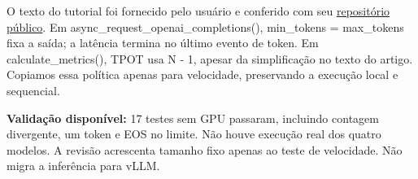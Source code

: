 \documentclass[10pt,a4paper]{article}
\begin{document}
O texto do tutorial foi fornecido pelo usuário e conferido com seu \href{https://github.com/gjgjos/vllm_benchmark_serving}{repositório público}. Em async\_request\_openai\_completions(), min\_tokens = max\_tokens fixa a saída; a latência termina no último evento de token. Em calculate\_metrics(), TPOT usa N - 1, apesar da simplificação no texto do artigo. Copiamos essa política apenas para velocidade, preservando a execução local e sequencial.

\textbf{Validação disponível:} 17 testes sem GPU passaram, incluindo contagem divergente, um token e EOS no limite. Não houve execução real dos quatro modelos. A revisão acrescenta tamanho fixo apenas ao teste de velocidade. Não migra a inferência para vLLM.
\end{document}
